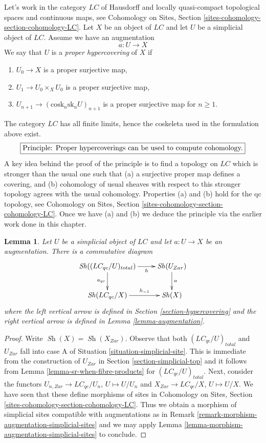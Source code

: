 \documentclass{stacks-project}
\theoremstyle{plain}
\newtheorem{lemma}[subsection]{Lemma}
\theoremstyle{definition}
\theoremstyle{remark}
\numberwithin{equation}{subsection}
\def\Sh{\mathop{\mathit{Sh}}\nolimits}
\begin{document}
\noindent
Let's work in the category $\textit{LC}$ of Hausdorff and locally
quasi-compact topological spaces and continuous maps, see
Cohomology on Sites, Section \ref{sites-cohomology-section-cohomology-LC}.
Let $X$ be an object of $\textit{LC}$ and let $U$ be a simplicial
object of $\textit{LC}$. Assume we have an augmentation
$$
a : U \to X
$$
We say that $U$ is a {\it proper hypercovering} of $X$ if
\begin{enumerate}
\item $U_0 \to X$ is a proper surjective map,
\item $U_1 \to U_0 \times_X U_0$ is a proper surjective map,
\item $U_{n + 1} \to (\text{cosk}_n\text{sk}_n U)_{n + 1}$
is a proper surjective map for $n \geq 1$.
\end{enumerate}
The category $\textit{LC}$ has all finite limits, hence the
coskeleta used in the formulation above exist.
$$
\fbox{Principle: Proper hypercoverings can be used to compute cohomology.}
$$
A key idea behind the proof of the principle is to find a topology
on $\textit{LC}$ which is stronger than the usual one such that
(a) a surjective proper map defines a covering, and
(b) cohomology of usual sheaves with respect to this stronger
topology agrees with the usual cohomology.
Properties (a) and (b) hold for the qc topology, see
Cohomology on Sites, Section \ref{sites-cohomology-section-cohomology-LC}.
Once we have (a) and (b) we deduce the principle via
the earlier work done in this chapter.

\begin{lemma}
\label{lemma-compare-simplicial-objects}
Let $U$ be a simplicial object of $\textit{LC}$ and let $a : U \to X$
be an augmentation. There is a commutative diagram
$$
\xymatrix{
\Sh((\textit{LC}_{qc}/U)_{total}) \ar[r]_-h \ar[d]_{a_{qc}} &
\Sh(U_{Zar}) \ar[d]^a \\
\Sh(\textit{LC}_{qc}/X) \ar[r]^-{h_{-1}} &
\Sh(X)
}
$$
where the left vertical arrow is defined in
Section \ref{section-hypercovering}
and the right vertical arrow is defined in
Lemma \ref{lemma-augmentation}.
\end{lemma}

\begin{proof}
Write $\Sh(X) = \Sh(X_{Zar})$. Observe that both
$(\textit{LC}_{qc}/U)_{total}$ and $U_{Zar}$ fall
into case A of Situation \ref{situation-simplicial-site}.
This is immediate from the construction of
$U_{Zar}$ in Section \ref{section-simplicial-top}
and it follows from Lemma \ref{lemma-sr-when-fibre-products}
for $(\textit{LC}_{qc}/U)_{total}$.
Next, consider the functors
$U_{n, Zar} \to \textit{LC}_{qc}/U_n$, $U \mapsto U/U_n$
and
$X_{Zar} \to \textit{LC}_{qc}/X$, $U \mapsto U/X$.
We have seen that these define morphisms of sites
in Cohomology on Sites, Section \ref{sites-cohomology-section-cohomology-LC}.
Thus we obtain a morphism of simplicial sites compatible with
augmentations as in Remark \ref{remark-morphism-augmentation-simplicial-sites}
and we may apply
Lemma \ref{lemma-morphism-augmentation-simplicial-sites} to conclude.
\end{proof}
\end{document}
